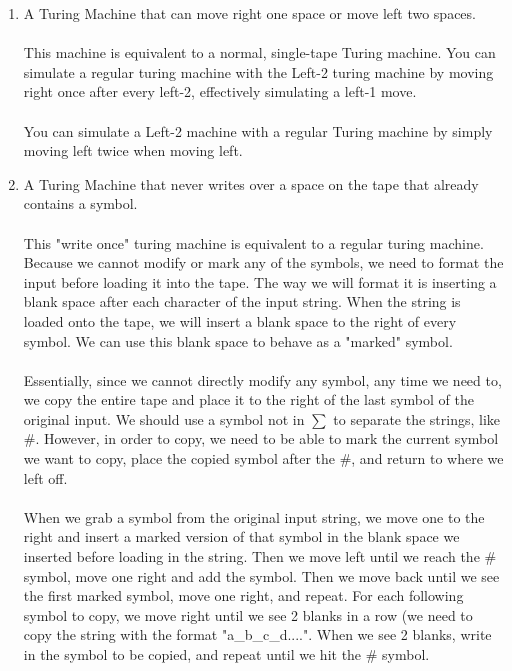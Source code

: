 \documentclass{article}
\begin{document}
\begin{enumerate}[\indent a)]
    \item A Turing Machine that can move right one space or move left two spaces.
    \\\\ This machine is equivalent to a normal, single-tape Turing machine. You can simulate
    a regular turing machine with the Left-2 turing machine by moving right once after every left-2, effectively 
    simulating a left-1 move.
    \\\\You can simulate a Left-2 machine with a regular Turing machine by simply moving left twice when moving left.
    \item A Turing Machine that never writes over a space on the tape that already contains a symbol.
    \\\\This "write once" turing machine is equivalent to a regular turing machine. Because we cannot modify or mark any of the symbols, we need to format the input before loading it into the tape.
The way we will format it is inserting a blank space after each character of the input string. When the string is loaded onto the tape, we will insert a blank space to the right of every symbol. We can use this blank space to behave as a "marked" symbol.
\\\\Essentially, since we cannot directly modify any symbol, any time we need to, we copy the entire tape and place it to the right of the last symbol of the original input. We should use a symbol not in $\sum$ to separate the strings, like \#. 
However, in order to copy, we need to be able to mark the current symbol we want to copy, place the copied symbol after the \#, and return to where we left off.
\\\\When we grab a symbol from the original input string, we move one to the right and insert a marked version of that symbol in the blank space we inserted before loading in the string. Then we move left until we reach the \# symbol, move one right and add the symbol. Then we move back until we see the first marked symbol, move one right, and repeat.
For each following symbol to copy, we move right until we see 2 blanks in a row (we need to copy the string with the format "a\_b\_c\_d....". When we see 2 blanks, write in the symbol to be copied, and repeat until we hit the \# symbol.
    
\end{enumerate}
\end{document}
